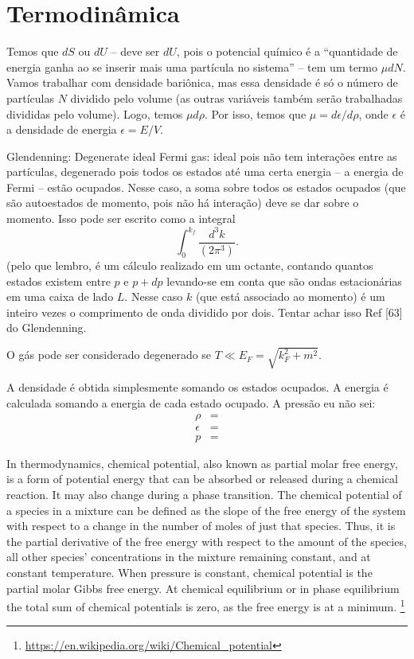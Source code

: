 \section{Termodinâmica}

Temos que $dS$ ou $dU$ -- deve ser $dU$, pois o potencial químico é a ``quantidade de energia ganha ao se inserir mais uma partícula no sistema'' -- tem um termo $\mu dN$. Vamos trabalhar com densidade bariônica, mas essa densidade é só o número de partículas $N$ dividido pelo volume (as outras variáveis também serão trabalhadas divididas pelo volume). Logo, temos $\mu d\rho$. Por isso, temos que $\mu = d\epsilon/d\rho$, onde $\epsilon$ é a densidade de energia $\epsilon = E/V$. 

Glendenning\cite{Glendenning}:
Degenerate ideal Fermi gas: ideal pois não tem interações entre as partículas, degenerado pois todos os estados até uma certa energia -- a energia de Fermi -- estão ocupados. Nesse caso, a soma sobre todos os estados ocupados (que são autoestados de momento, pois não há interação) deve se dar sobre o momento. Isso pode ser escrito como a integral
\begin{equation}
	\int_0^{k_f} \frac{d^3k}{(2\pi^3)}.
\end{equation}
%
(pelo que lembro, é um cálculo realizado em um octante, contando quantos estados existem entre $p$ e $p+dp$ levando-se em conta que são ondas estacionárias em uma caixa de lado $L$. Nesse caso $k$ (que está associado ao momento) é um inteiro vezes o comprimento de onda dividido por dois. Tentar achar isso Ref [63] do Glendenning.

O gás pode ser considerado degenerado se $T \ll E_F = \sqrt{k_F^2 + m^2}$.

A densidade é obtida simplesmente somando os estados ocupados. A energia é calculada somando a energia de cada estado ocupado. A pressão eu não sei:
\begin{align}
	\rho &= \\
	\epsilon &= \\
	p &=
\end{align}

In thermodynamics, chemical potential, also known as partial molar free energy, is a form of potential energy that can be absorbed or released during a chemical reaction. It may also change during a phase transition. The chemical potential of a species in a mixture can be defined as the slope of the free energy of the system with respect to a change in the number of moles of just that species. Thus, it is the partial derivative of the free energy with respect to the amount of the species, all other species' concentrations in the mixture remaining constant, and at constant temperature. When pressure is constant, chemical potential is the partial molar Gibbs free energy. At chemical equilibrium or in phase equilibrium the total sum of chemical potentials is zero, as the free energy is at a minimum. \footnote{\url{https://en.wikipedia.org/wiki/Chemical_potential}}